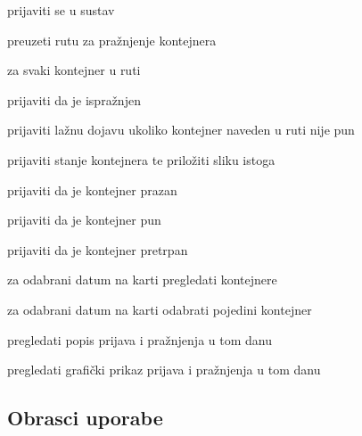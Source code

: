 \begin{packed_enum}
				\begin{packed_enum}
					
					\item prijaviti se u sustav
					
					\item preuzeti rutu za pražnjenje kontejnera
					\item za svaki kontejner u ruti
					
						\begin{packed_enum}
						
						\item  prijaviti da je ispražnjen
						\item  prijaviti lažnu dojavu ukoliko kontejner naveden u ruti nije pun
				
					\end{packed_enum}
					
					\item prijaviti stanje kontejnera te priložiti sliku istoga
					\begin{packed_enum}
					
						\item prijaviti da je kontejner prazan
						\item prijaviti da je kontejner pun
						\item prijaviti da je kontejner pretrpan
						
					\end {packed_enum}	
					
					\item za odabrani datum na karti pregledati kontejnere 
					\item za odabrani datum na karti odabrati pojedini kontejner
					\begin{packed_enum}
						
						\item  pregledati popis prijava i pražnjenja u tom danu
						\item  pregledati grafički prikaz prijava i pražnjenja u tom danu
				
					\end{packed_enum}
					
				\end{packed_enum}

				
			\end{packed_enum}
			
			\eject 
			
			
				
			\subsection{Obrasci uporabe}
				
